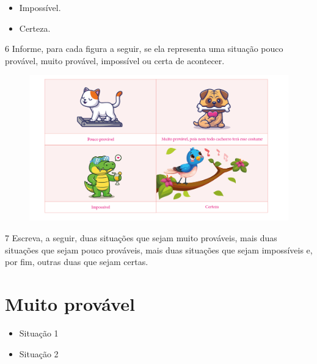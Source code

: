 \begin{itemize}
\item Impossível.


\item Certeza.

\end{itemize}

\num{6} Informe, para cada figura a seguir, se ela representa uma situação pouco
provável, muito provável, impossível ou certa de acontecer.

\begin{figure}[H]
\includegraphics[width=\textwidth]{./media/image88_prof.png}
\end{figure}

\num{7} Escreva, a seguir, duas situações que sejam muito prováveis, mais duas
situações que sejam pouco prováveis, mais duas situações que sejam
impossíveis e, por fim, outras duas que sejam certas.

\vspace*{-1em}
\section*{Muito provável}

\begin{itemize}
\item Situação 1
\end{itemize}

\begin{itemize}
\item Situação 2
\end{itemize}

